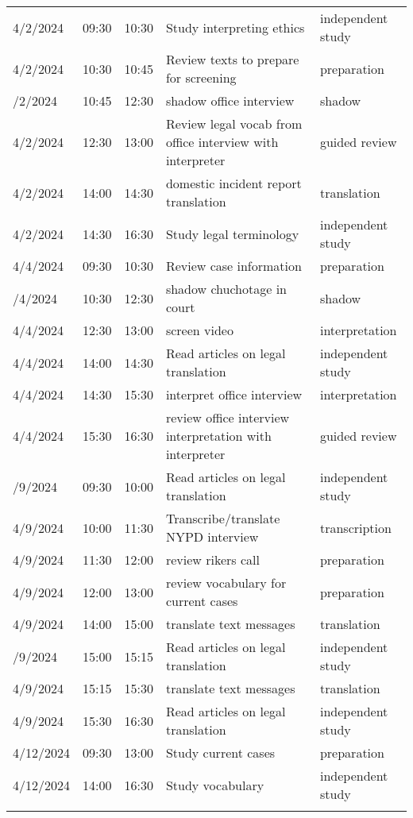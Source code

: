 \begin{table}
\begin{tabular}{lllll}
4/2/2024 & 09:30 & 10:30 & Study interpreting ethics & independent study\\
4/2/2024 & 10:30 & 10:45 & Review texts to prepare for screening & preparation\\
\addlinespace
4/2/2024 & 10:45 & 12:30 & shadow office interview & shadow\\
4/2/2024 & 12:30 & 13:00 & Review legal vocab from office interview with interpreter & guided review\\
4/2/2024 & 14:00 & 14:30 & domestic incident report translation & translation\\
4/2/2024 & 14:30 & 16:30 & Study legal terminology & independent study\\
4/4/2024 & 09:30 & 10:30 & Review case information & preparation\\
\addlinespace
4/4/2024 & 10:30 & 12:30 & shadow chuchotage in court & shadow\\
4/4/2024 & 12:30 & 13:00 & screen video & interpretation\\
4/4/2024 & 14:00 & 14:30 & Read articles on legal translation & independent study\\
4/4/2024 & 14:30 & 15:30 & interpret office interview & interpretation\\
4/4/2024 & 15:30 & 16:30 & review office interview interpretation with interpreter & guided review\\
\addlinespace
4/9/2024 & 09:30 & 10:00 & Read articles on legal translation & independent study\\
4/9/2024 & 10:00 & 11:30 & Transcribe/translate NYPD interview & transcription\\
4/9/2024 & 11:30 & 12:00 & review rikers call & preparation\\
4/9/2024 & 12:00 & 13:00 & review vocabulary for current cases & preparation\\
4/9/2024 & 14:00 & 15:00 & translate text messages & translation\\
\addlinespace
4/9/2024 & 15:00 & 15:15 & Read articles on legal translation & independent study\\
4/9/2024 & 15:15 & 15:30 & translate text messages & translation\\
4/9/2024 & 15:30 & 16:30 & Read articles on legal translation & independent study\\
4/12/2024 & 09:30 & 13:00 & Study current cases & preparation\\
4/12/2024 & 14:00 & 16:30 & Study vocabulary & independent study\\
\addlinespace

\end{tabular}
\end{table}
